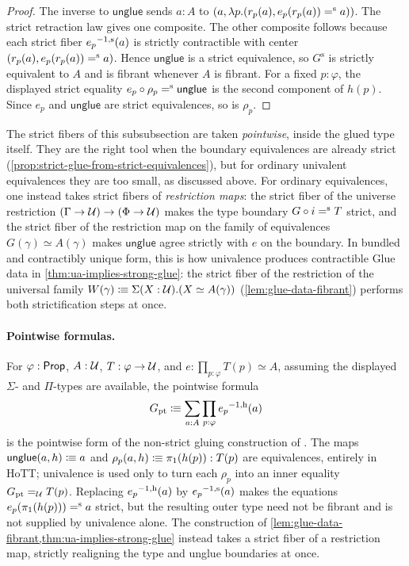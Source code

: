 \begin{longversion}
\begin{proof}
The inverse to \(\mathsf{unglue}\) sends \(a:A\) to
\((a,\lambda p.(r_p(a), e_p(r_p(a))\mathrel{=^\textup{s}} a))\). The strict retraction law gives
one composite. The other composite follows because each strict fiber
\({e_p}^{-1, \textup{s}}(a)\) is strictly contractible with center
\((r_p(a), e_p(r_p(a))\mathrel{=^\textup{s}} a)\). Hence \(\mathsf{unglue}\) is a strict
equivalence, so \(G^{\mathrm{s}}\) is strictly equivalent to \(A\) and is fibrant
whenever \(A\) is fibrant. For a fixed \(p:\varphi\), the displayed strict equality
\(e_p\circ\rho_p\mathrel{=^\textup{s}}\mathsf{unglue}\) is the second component of \(h(p)\).
Since \(e_p\) and \(\mathsf{unglue}\) are strict equivalences, so is
\(\rho_p\).
\end{proof}


\begin{remark}\label{rem:pointwise-vs-restriction-strict-fibres}
The strict fibers of this subsubsection are taken \emph{pointwise}, inside
the glued type itself. They are the right tool when the boundary
equivalences are already strict
(\cref{prop:strict-glue-from-strict-equivalences}), but for ordinary
univalent equivalences they are too small, as discussed above. For
ordinary equivalences, one instead takes strict fibers of
\emph{restriction maps}: the strict fiber of the universe
restriction \((\Gamma\to\mathcal{U})\to(\Phi\to\mathcal{U})\) makes the type boundary
\(G\circ i\mathrel{=^\textup{s}} T\) strict, and the strict fiber of the restriction map on
the family of equivalences \(G(\gamma)\simeq A(\gamma)\) makes
\(\mathsf{unglue}\) agree strictly with \(e\) on the boundary. In bundled
and contractibly unique form, this is how univalence produces
contractible Glue data in \cref{thm:ua-implies-strong-glue}: the strict fiber of
the restriction of the universal family
\(W(\gamma)\mathrel{\vcentcolon\mspace{-1mu}\equiv}\Sigma(X:\mathcal{U}).(X\simeq A(\gamma))\)
(\cref{lem:glue-data-fibrant}) performs both strictification steps at
once.
\end{remark}
\end{longversion}


\paragraph{Pointwise formulas.}
For $\varphi:\mathsf{Prop}$, $A:\mathcal{U}$, $T:\varphi\to\mathcal{U}$, and
$e:\prod_{p:\varphi}T(p)\simeq A$, assuming the displayed
$\Sigma$- and $\Pi$-types are available, the pointwise formula
\[
G_{\mathrm{pt}}
\mathrel{\vcentcolon\mspace{-1mu}\equiv}
\sum_{a:A}\prod_{p:\varphi}{e_p}^{-1, \textup{h}}(a)
\]
is the pointwise form of the non-strict gluing construction of
\citet[Def.~6.1]{OrtonPitts2018}. The maps
$\mathsf{unglue}(a,h)\mathrel{\vcentcolon\mspace{-1mu}\equiv} a$ and
$\rho_p(a,h)\mathrel{\vcentcolon\mspace{-1mu}\equiv}\pi_1(h(p)):T(p)$ are equivalences,
entirely in HoTT; univalence is used only to turn each $\rho_p$
into an inner equality $G_{\mathrm{pt}}=_{\mathcal{U}} T(p)$.
Replacing ${e_p}^{-1, \textup{h}}(a)$ by ${e_p}^{-1, \textup{s}}(a)$ makes the equations
$e_p(\pi_1(h(p)))\mathrel{=^\textup{s}} a$ strict, but the resulting outer type need
not be fibrant and is not supplied by univalence alone. The
construction of \cref{lem:glue-data-fibrant,thm:ua-implies-strong-glue}
instead takes a strict fiber of a restriction map, strictly
realigning the type and unglue boundaries at once.


